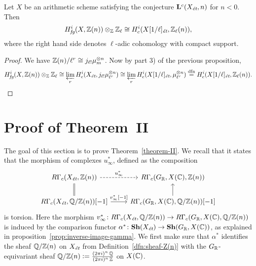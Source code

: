 \documentclass{article}
\numberwithin{equation}{section}
\begin{document}
\begin{corollary}
  \label{cor:RGamma-fg-model-for-l-adic-cohomology}
  Let $X$ be an arithmetic scheme satisfying the conjecture
  $\mathbf{L}^c (X_\et, n)$ for $n < 0$. Then
  $$H_\fg^i (X, \ZZ (n)) \otimes_\ZZ \ZZ_\ell \cong H^i_c (X [1/\ell]_\et, \ZZ_\ell (n)),$$
  where the right hand side denotes $\ell$-adic cohomology with compact support.

  \begin{proof}
    We have $\ZZ (n)/\ell^r \cong j_{\ell!} \mu_m^{\otimes n}$.
    Now by part 3) of the previous proposition,
    \[ H_\fg^i (X, \ZZ (n)) \otimes_\ZZ \ZZ_\ell \cong
      \varprojlim_r H_c^i (X_\et, j_{\ell!} \mu_{\ell^r}^{\otimes n}) \cong
      \varprojlim_r H_c^i (X [1/\ell]_\et, \mu_{\ell^r}^{\otimes n})
      \stackrel{\text{dfn}}{=} H_c^i (X [1/\ell]_\et, \ZZ_\ell (n)). \qedhere \]
  \end{proof}
\end{corollary}


\section{Proof of Theorem~II}
\label{sec:theorem-II}

The goal of this section is to prove Theorem~\ref{theorem-II}. We recall that it
states that the morphism of complexes $u_\infty^*$, defined as the composition
\[ \begin{tikzcd}
  R\Gamma_c (X_\et, \ZZ(n)) \ar[equals]{d}\ar[dashed]{r}{u_\infty^*} & R\Gamma_c (G_\RR, X (\CC), \ZZ (n)) \\
  R\Gamma_c (X_\et, \QQ/\ZZ (n)) [-1] \ar{r}{v_\infty^* [-1]} & R\Gamma_c (G_\RR, X (\CC), \QQ/\ZZ (n)) [-1] \ar{u}
\end{tikzcd} \]
is torsion. Here the morphism
$v_\infty^*\colon R\Gamma_c (X_\et, \QQ/\ZZ (n)) \to R\Gamma_c (G_\RR, X (\CC), \QQ/\ZZ (n))$
is induced by the comparison functor
$\alpha^*\colon \mathbf{Sh} (X_\et) \to \mathbf{Sh} (G_\RR, X (\CC))$, as
explained in proposition~\ref{prop:inverse-image-gamma}. We first make sure that
$\alpha^*$ identifies the sheaf $\QQ/\ZZ (n)$ on $X_\et$ from
Definition~\ref{dfn:sheaf-Z(n)} with the $G_\RR$-equivariant sheaf
$\QQ/\ZZ (n) \dfn \frac{(2\pi i)^n\,\QQ}{(2\pi i)^n\,\ZZ}$ on $X (\CC)$.
\end{document}
